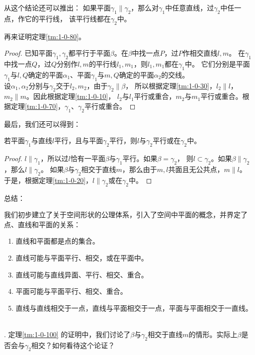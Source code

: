 \documentclass[12pt,UTF8,fontset=none]{ctexbook}
\begin{document}
从这个结论还可以推出：
如果平面$\gamma_1\parallel \gamma_2$，那么对$\gamma_1$中任意直线，过$\gamma_2$中任一点，作它的平行线，
该平行线都在$\gamma_2$中。

再来证明定理\ref{tm:1-0-80}。
\begin{proof}
    已知平面$\gamma_1,\gamma_2$都平行于平面$\beta$。在$\beta$中找一点$P$，过$P$作相交直线$l,m$。
    在$\gamma_1$中找一点$Q$，过$Q$分别作$l,m$的平行线$l_1,m_1$，则$l_1,m_1$都在$\gamma_1$中。
    它们分别是平面$\gamma_1$与$l,Q$确定的平面$\alpha_1$、平面$\gamma_1$与$m,Q$确定的平面$\alpha_2$的交线。\\
    设$\alpha_1,\alpha_2$分别与$\gamma_2$交于$l_2,m_2$，由于$\gamma_2\parallel \beta$，
    所以根据定理\ref{tm:1-0-30}，$l_2\parallel l$，$m_2\parallel m$。因此根据定理\ref{tm:1-0-10}，
    $l_2$与$l_1$平行或重合，$m_2$与$m_1$平行或重合。根据定理\ref{tm:1-0-70}，$\gamma_1$、$\gamma_2$平行或重合。
\end{proof}

最后，我们还可以得到：
\begin{tm}\label{tm:1-0-100}
    若平面$\gamma_1$与直线$l$平行，且与平面$\gamma_2$平行，则$l$与$\gamma_2$平行或在$\gamma_2$中。
\end{tm}
\begin{proof}
    $l\parallel \gamma_1$，所以过$l$恰有一平面$\beta$与$\gamma_1$平行。如果$\beta=\gamma_2$，
    则$l\subset\gamma_2$。如果$\beta\parallel\gamma_2$，那么$l\parallel \gamma_2$。
    如果$\beta$与$\gamma_2$相交于直线$m$，那么由于$m,l$共面且无公共点，$m\parallel l$。
    于是，根据定理\ref{tm:1-0-20}，$l\parallel \gamma_2$或在$\gamma_2$中。
\end{proof}

总结：

我们初步建立了关于空间形状的公理体系，引入了空间中平面的概念，并界定了点、直线和平面的关系：
\begin{enumerate}
    \item 直线和平面都是点的集合。
    \item 直线可能与平面平行、相交，或在平面中。
    \item 直线可能与直线异面、平行、相交、重合。
    \item 平面可能与平面平行、相交、重合。
    \item 直线与直线相交于一点，直线与平面相交于一点，平面与平面相交于一直线。
\end{enumerate}

\begin{sk}
    \mbox{} \\
    . 定理\ref{tm:1-0-100} 的证明中，我们讨论了$\beta$与$\gamma_2$相交于直线$m$的情形。实际上$\beta$是否会与$\gamma_2$相交？如何看待这个论证？
\end{sk}
\end{document}
